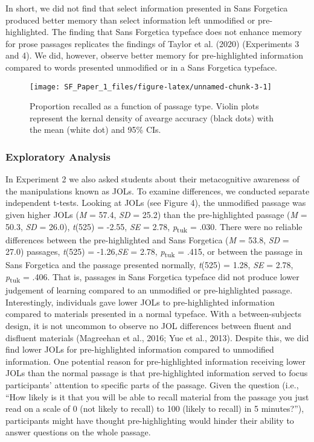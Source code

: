 \documentclass[
  english,
  jou]{apa6}
\begin{document}
In short, we did not find that select information presented in Sans Forgetica produced better memory than select information left unmodified or pre-highlighted. The finding that Sans Forgetica typeface does not enhance memory for prose passages replicates the findings of Taylor et al. (2020) (Experiments 3 and 4). We did, however, observe better memory for pre-highlighted information compared to words presented unmodified or in a Sans Forgetica typeface.

\begin{figure}

{\centering \texttt{[image: SF\_Paper\_1\_files/figure-latex/unnamed-chunk-3-1]} 

}

\caption{Proportion recalled as a function of passage type. Violin plots represent the kernal density of avearge accuracy (black dots) with the mean (white dot) and 95\% CIs.}\label{fig:unnamed-chunk-3}
\end{figure}

\hypertarget{exploratory-analysis}{%
\subsubsection{Exploratory Analysis}\label{exploratory-analysis}}

In Experiment 2 we also asked students about their metacognitive awareness of the manipulations known as JOLs. To examine differences, we conducted separate independent t-tests. Looking at JOLs (see Figure 4), the unmodified passage was given higher JOLs (\emph{M} = 57.4, \emph{SD} = 25.2) than the pre-highlighted passage (\emph{M} = 50.3, \emph{SD} = 26.0), \emph{t}(525) = -2.55, \emph{SE} = 2.78, \emph{p}\textsubscript{tuk} = .030. There were no reliable differences between the pre-highlighted and Sans Forgetica (\emph{M} = 53.8, \emph{SD} = 27.0) passages, \emph{t}(525) = -1.26,\emph{SE} = 2.78, \emph{p}\textsubscript{tuk} = .415, or between the passage in Sans Forgetica and the passage presented normally, \emph{t}(525) = 1.28, \emph{SE} = 2.78, \emph{p}\textsubscript{tuk} = .406. That is, passages in Sans Forgetica typeface did not produce lower judgement of learning compared to an unmodified or pre-highlighted passage. Interestingly, individuals gave lower JOLs to pre-highlighted information compared to materials presented in a normal typeface. With a between-subjects design, it is not uncommon to observe no JOL differences between fluent and disfluent materials (Magreehan et al., 2016; Yue et al., 2013). Despite this, we did find lower JOLs for pre-highlighted information compared to unmodified information. One potential reason for pre-highlighted information receiving lower JOLs than the normal passage is that pre-highlighted information served to focus participants' attention to specific parts of the passage. Given the question (i.e., \enquote{How likely is it that you will be able to recall material from the passage you just read on a scale of 0 (not likely to recall) to 100 (likely to recall) in 5 minutes?}), participants might have thought pre-highlighting would hinder their ability to answer questions on the whole passage.
\end{document}

